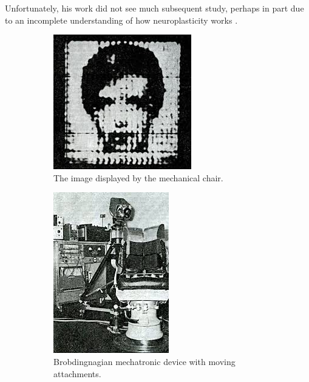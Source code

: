 \documentclass[
hidelinks,
12pt, %
oneside, %
english, %
doublespacing, %
headsepline, %
]{MastersDoctoralThesis} %
\begin{document}
Unfortunately, his work did not see much subsequent study, perhaps in part due to an incomplete understanding of how neuroplasticity works \parencite{doidge_brain_2008}.

\begin{figure}[th]
	\centering
  \begin{subfigure}[b]{0.4\textwidth}
		\centering
    \includegraphics[height=0.75\textwidth]{images/K7PqL}
		\decoRule
    \caption[Mechanical Chair Image]{The image displayed by the mechanical chair.}
    \label{fig:chair_image}
  \end{subfigure}
  \begin{subfigure}[b]{0.4\textwidth}
		\centering
    \includegraphics[height=0.75\textwidth]{images/fnJ33}
		\decoRule
    \caption[Mechanical Chair]{Brobdingnagian mechatronic device with moving attachments.}
    \label{fig:chair}
  \end{subfigure}
	\caption[Mechanical apparatus for sensory substitution]{}
\end{figure}
\end{document}
